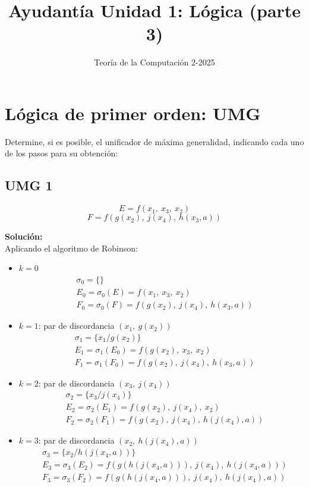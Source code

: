 \documentclass{article}
\begin{document}
\title{Ayudantía Unidad 1: Lógica (parte 3)}
\author{Teoría de la Computación 2-2025}
\date{}

\maketitle

\section{Lógica de primer orden: UMG}

Determine, si es posible, el unificador de máxima generalidad, indicando cada uno de los pasos para su obtención:

\subsection{UMG 1}

$$E = f(x_{1},\ x_{3},\ x_{2})$$
$$F = f(g(x_{2}),\ j(x_{4}),\ h(x_{3}, a))$$

\textbf{Solución:}\\ Aplicando el algoritmo de Robinson:

\begin{itemize}
  \item $k = 0$
  \begin{align*}
    &\sigma_{0} = \{\}\\
    &E_{0} = \sigma_{0}(E) = f(x_{1},\ x_{3},\ x_{2})\\
    &F_{0} = \sigma_{0}(F) = f(g(x_{2}),\ j(x_{4}),\ h(x_{3}, a))
  \end{align*}


  \item $k = 1$: par de discordancia $(x_{1},\ g(x_{2}))$
  \begin{align*}
    &\sigma_{1} = \{x_{1} / g(x_{2})\}\\
    &E_{1} = \sigma_{1}(E_{0}) = f(g(x_{2}),\ x_{3},\ x_{2})\\
    &F_{1} = \sigma_{1}(F_{0}) = f(g(x_{2}),\ j(x_{4}),\ h(x_{3}, a))
  \end{align*}


  \item $k = 2$: par de discordancia $(x_{3},\ j(x_{4}))$
  \begin{align*}
    &\sigma_{2} = \{x_{3}/j(x_{4})\}\\
    &E_{2} = \sigma_{2}(E_{1}) = f(g(x_{2}),\ j(x_{4}),\ x_{2})\\
    &F_{2} = \sigma_{2}(F_{1}) = f(g(x_{2}),\ j(x_{4}),\ h(j(x_{4}), a))
  \end{align*}


  \item $k = 3$: par de discordancia $(x_{2},\ h(j(x_{4}), a))$
  \begin{align*}
    &\sigma_{3} = \{x_{2}/h(j(x_{4}, a))\}\\
    &E_{3} = \sigma_{3}(E_{2}) = f(g(h(j(x_{4}, a))),\ j(x_{4}),\ h(j(x_{4}, a)))\\
    &F_{3} = \sigma_{3}(F_{2}) = f(g(h(j(x_{4}, a))),\ j(x_{4}),\ h(j(x_{4}), a))
  \end{align*}
\end{itemize}
\end{document}
